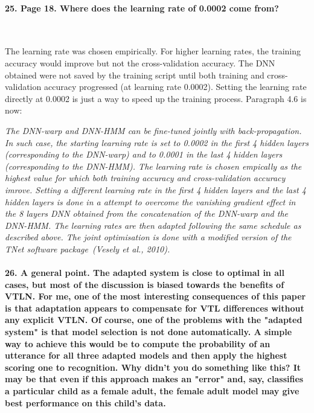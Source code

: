 \documentclass[]{article}
\begin{document}
\paragraph{25. Page 18. Where does the learning rate of 0.0002 come from?}

~

The learning rate was chosen empirically. For higher learning rates, the training accuracy would improve but not the cross-validation accuracy. The DNN obtained were not saved by the training script until both training and cross-validation accuracy progressed (at learning rate 0.0002). Setting the learning rate directly at 0.0002 is just a way to speed up the training process. Paragraph 4.6 is now:

\textit{The DNN-warp and DNN-HMM can be fine-tuned jointly with back-propagation. In such case, the starting learning rate is set to 0.0002 in the first 4 hidden layers (corresponding to the DNN-warp) and to 0.0001 in the last 4 hidden layers (corresponding to the DNN-HMM). The learning rate is chosen empically as the highest value for which both training accuracy and cross-validation accuracy imrove. Setting a different learning rate in the first 4 hidden layers and the last 4 hidden layers is done in a attempt to overcome the vanishing gradient effect in the 8 layers DNN obtained from the concatenation of the DNN-warp and the DNN-HMM. The learning rates are then adapted following the same schedule as described above. The joint optimisation is done with a modified version of the TNet software package~(Vesely et al., 2010).}

\paragraph{26. A general point. The adapted system is close to optimal in all cases, but most of the discussion is biased towards the benefits of VTLN. For me, one of the most interesting consequences of this paper is that adaptation appears to compensate for VTL differences without any explicit VTLN. Of course, one of the problems with the "adapted system" is that model selection is not done automatically. A simple way to achieve this would be to compute the probability of an utterance for all three adapted models and then apply the highest scoring one to recognition. Why didn't you do something like this? It may be that even if this approach makes an "error" and, say, classifies a particular child as a female adult, the female adult model may give best performance on this child's data.}
\end{document}
